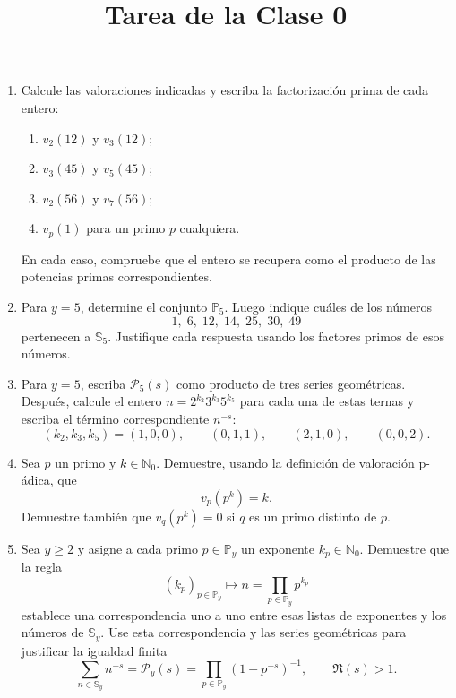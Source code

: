 \documentclass[11pt,a4paper]{article}
\title{Tarea de la Clase 0}
\author{}
\date{}
\newcommand{\Nzero}{\mathbb{N}_0}
\begin{document}
\maketitle
{}\par

\begin{enumerate}
    \item Calcule las valoraciones indicadas y escriba la factorización prima de cada entero:
    \begin{enumerate}
        \item $v_2(12)$ y $v_3(12)$;
        \item $v_3(45)$ y $v_5(45)$;
        \item $v_2(56)$ y $v_7(56)$;
        \item $v_p(1)$ para un primo $p$ cualquiera.
    \end{enumerate}
    En cada caso, compruebe que el entero se recupera como el producto de las potencias primas correspondientes.

    \item Para $y=5$, determine el conjunto $\mathbb{P}_5$. Luego indique cuáles de los números
    \[
      1,\;6,\;12,\;14,\;25,\;30,\;49
    \]
    pertenecen a $\mathbb{S}_5$. Justifique cada respuesta usando los factores primos de esos números.

    \item Para $y=5$, escriba $\mathscr{P}_5(s)$ como producto de tres series geométricas. Después, calcule el entero
    $n=2^{k_2}3^{k_3}5^{k_5}$ para cada una de estas ternas y escriba el término correspondiente $n^{-s}$:
    \[
      (k_2,k_3,k_5)=(1,0,0),\qquad (0,1,1),\qquad
      (2,1,0),\qquad (0,0,2).
    \]

    \item Sea $p$ un primo y $k\in\Nzero$. Demuestre, usando la definición de valoración p-ádica, que
    \[
      v_p(p^k)=k.
    \]
    Demuestre también que $v_q(p^k)=0$ si $q$ es un primo distinto de $p$.

    \item Sea $y\ge2$ y asigne a cada primo $p\in\mathbb{P}_y$ un exponente $k_p\in\Nzero$. Demuestre que la regla
    \[
      (k_p)_{p\in\mathbb{P}_y}\longmapsto
      n=\prod_{p\in\mathbb{P}_y}p^{k_p}
    \]
    establece una correspondencia uno a uno entre esas listas de exponentes y los números de $\mathbb{S}_y$.
    Use esta correspondencia y las series geométricas para justificar la igualdad finita
    \[
      \sum_{n\in\mathbb{S}_y}n^{-s}
      =\mathscr{P}_y(s)
      =\prod_{p\in\mathbb{P}_y}(1-p^{-s})^{-1},
      \qquad \Re(s)>1.
    \]
\end{enumerate}
\end{document}
